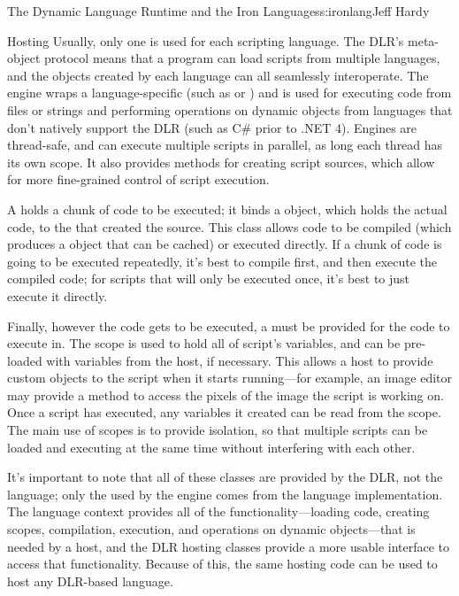\begin{aosachapter}{The Dynamic Language Runtime and the Iron Languages}{s:ironlang}{Jeff Hardy}
\begin{aosasect1}{Hosting}
Usually, only one  is used for each scripting language. The DLR's meta-object protocol means that a program can load scripts from multiple languages, and the objects created by each language can all seamlessly interoperate. The engine wraps a language-specific  (such as  or ) and is used for executing code from files or strings and performing operations on dynamic objects from languages that don't natively support the DLR (such as C\# prior to .NET 4).  Engines are thread-safe, and can execute multiple scripts in parallel, as long each thread has its own scope. It also provides methods for creating script sources, which allow for more fine-grained control of script execution. 

A  holds a chunk of code to be executed; it binds a  object, which holds the actual code, to the  that created the source. This class allows code to be compiled (which produces a  object that can be cached) or executed directly. If a chunk of code is going to be executed repeatedly, it's best to compile first, and then execute the compiled code; for scripts that will only be executed once, it's best to just execute it directly.

Finally, however the code gets to be executed, a  must be provided for the code to execute in. The scope is used to hold all of script's variables, and can be pre-loaded with variables from the host, if necessary. This allows a host to provide custom objects to the script when it starts running---for example, an image editor may provide a method to access the pixels of the image the script is working on. Once a script has executed, any variables it created can be read from the scope. The main use of scopes is to provide isolation, so that multiple scripts can be loaded and executing at the same time without interfering with each other.

It's important to note that all of these classes are provided by the DLR, not the language; only the  used by the engine comes from the language implementation. The language context provides all of the functionality---loading code, creating scopes, compilation, execution, and operations on dynamic objects---that is needed by a host, and the DLR hosting classes provide a more usable interface to access that functionality. Because of this, the same hosting code can be used to host any DLR-based language.


\end{aosasect1}
\end{aosachapter}

